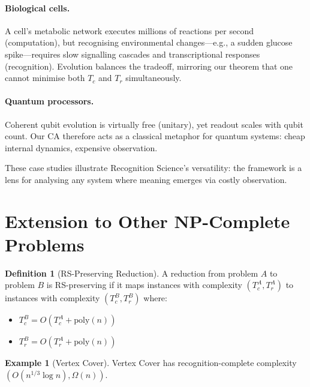 \documentclass[11pt]{article}
\theoremstyle{plain}
\theoremstyle{definition}
\newtheorem{definition}[theorem]{Definition}
\newtheorem{example}[theorem]{Example}
\theoremstyle{remark}
\begin{document}
\paragraph{Biological cells.}  A cell's metabolic network executes millions of reactions per second (computation), but recognising environmental changes---e.g., a sudden glucose spike---requires slow signalling cascades and transcriptional responses (recognition).  Evolution balances the tradeoff, mirroring our theorem that one cannot minimise both $T_c$ and $T_r$ simultaneously.

\paragraph{Quantum processors.}  Coherent qubit evolution is virtually free (unitary), yet readout scales with qubit count.  Our CA therefore acts as a classical metaphor for quantum systems: cheap internal dynamics, expensive observation.

These case studies illustrate Recognition Science's versatility: the framework is a lens for analysing any system where meaning emerges via costly observation.

\section{Extension to Other NP-Complete Problems}

\begin{definition}[RS-Preserving Reduction]
A reduction from problem $A$ to problem $B$ is RS-preserving if it maps instances with complexity $(T_c^A, T_r^A)$ to instances with complexity $(T_c^B, T_r^B)$ where:
\begin{itemize}
\item $T_c^B = O(T_c^A + \text{poly}(n))$
\item $T_r^B = O(T_r^A + \text{poly}(n))$
\end{itemize}
\end{definition}

\begin{example}[Vertex Cover]
Vertex Cover has recognition-complete complexity $(O(n^{1/3} \log n), \Omega(n))$.
\end{example}
\end{document}
